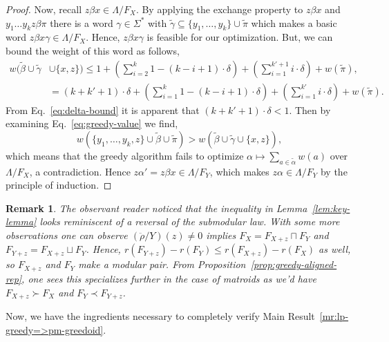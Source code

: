\documentclass[11pt]{article}
\newtheorem{remark}[theorem]{Remark}
\newcommand{\univ}{\Sigma}
\newcommand{\glang}{\Lambda}
\newcommand{\greedyrep}{\ddot{\rho}}
\begin{document}
\begin{proof}
    Now, recall $z\beta x \in \glang/F_X$. By applying the exchange property to $z\beta x$ and $y_1\ldots y_k z \beta \pi$ there is a word $\gamma\in\univ^*$ with $\widetilde{\gamma}\subseteq \{y_1,\ldots, y_k\}\cup\widetilde{\pi}$ which makes a basic word $z\beta x \gamma \in\glang/F_X$.
    Hence, $z\beta x \gamma$ is feasible for our optimization.
    But, we can bound the weight of this word as follows,
    \begin{equation*}
    \begin{split}
        w(\widetilde{\beta}\cup\widetilde{\gamma}&\cup\{x,z\}) \leq 1 + \left(\sum_{i=2}^{k} 1 - (k-i + 1)\cdot \delta\right) + \left(\sum_{i=1}^{k'+1} i\cdot \delta\right) + w(\widetilde{\pi}),\\
        &= (k+k' + 1)\cdot \delta +  \left(\sum_{i=1}^{k} 1 - (k-i + 1)\cdot \delta\right) + \left(\sum_{i=1}^{k'} i\cdot \delta\right) + w(\widetilde{\pi}).
    \end{split}
    \end{equation*}
    From Eq.~\ref{eq:delta-bound} it is apparent that $(k+k'+1)\cdot\delta <1$.
    Then by examining Eq.~\ref{eq:greedy-value} we find,
    $$w(\{y_1,\ldots, y_k, z\}\cup\widetilde{\beta}\cup\widetilde{\pi}) > w(\widetilde{\beta}\cup\widetilde{\gamma}\cup\{x,z\}),$$
    which means that the greedy algorithm fails to optimize $\alpha\mapsto \sum_{a\in\widetilde{\alpha}} w(a)$ over $\glang/F_X$, a contradiction.
    Hence $z\alpha' = z\beta x\in\glang/F_Y$, which makes $z\alpha\in\glang/F_Y$ by the principle of induction.
\end{proof}


\begin{remark}
    The observant reader noticed that the inequality in Lemma~\ref{lem:key-lemma} looks reminiscent of a reversal of the submodular law.
    With some more observations one can observe $\left(\greedyrep/Y\right)(z)\neq 0$ implies $F_X = F_{X+z} \sqcap F_Y$ and $F_{Y+z} = F_{X+z}\sqcup F_Y$.
    Hence, $r(F_{Y+z}) - r(F_Y) \leq r(F_{X+z}) - r(F_X)$ as well, so $F_{X+z}$ and $F_Y$ make a modular pair.
    From Proposition~\ref{prop:greedy-aligned-rep}, one sees this specializes further in the case of matroids as we'd have $F_{X+z}\succ F_X$ and $F_Y\prec F_{Y+z}$.
\end{remark}

Now, we have the ingredients necessary to completely verify Main Result~\ref{mr:lp-greedy=>pm-greedoid}.
\end{document}
